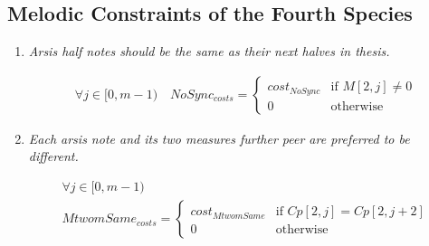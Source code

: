 \subsection*{Melodic Constraints of the Fourth Species}
\begin{enumerate}[wide, label=\bfseries 4.M\arabic*]
  \item\label{rule:fullsyncopations} {\textit{Arsis half notes should be the same as their next halves in thesis.}}


\begin{equation}
    \begin{gathered}
        \forall j \in [0, m-1) \quad
        NoSync_{costs} = \begin{cases}
            cost_{NoSync} & \text{if } M[2, j] \neq 0\\
            0 & \text{otherwise}
        \end{cases}
    \end{gathered}
\end{equation}

\item\label{rule:m2same} {\textit{Each arsis note and its two measures further peer are preferred to be different.}}


\begin{equation}
    \begin{gathered}
        \forall j \in [0, m-1)\\
        MtwomSame_{costs} = \begin{cases}
            cost_{MtwomSame} & \text{if } Cp[2, j] = Cp[2, j+2]\\
            0 & \text{otherwise}
        \end{cases}
    \end{gathered}
\end{equation}

\end{enumerate}
